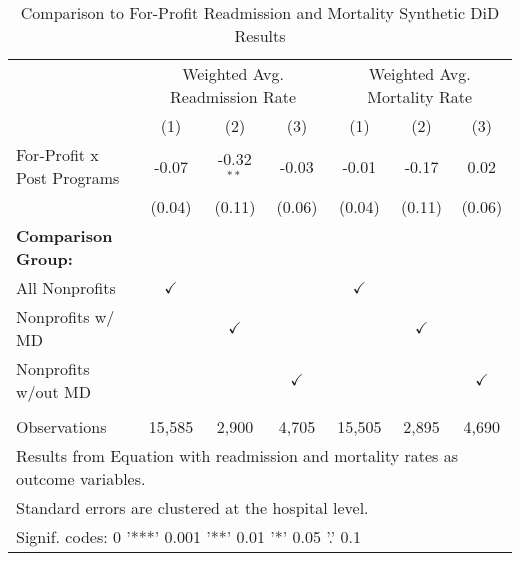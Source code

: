\begin{table}[ht!]

\caption{\label{tab:forprofit_readmort_synth}Comparison to For-Profit Readmission and Mortality Synthetic DiD Results}
\centering
\begin{tabular}[t]{lcccccc}
\toprule
\multicolumn{1}{c}{ } & \multicolumn{3}{c}{Weighted Avg. Readmission Rate} & \multicolumn{3}{c}{Weighted Avg. Mortality Rate} \\
 & (1) & (2) & (3) & (1) & (2) & (3)\\
\midrule
For-Profit x Post Programs & -0.07 & -0.32$^{**}$ & -0.03 & -0.01 & -0.17 & 0.02\\
 & (0.04) & (0.11) & (0.06) & (0.04) & (0.11) & (0.06)\\
\textbf{Comparison Group:} &  &  &  &  &  & \\
All Nonprofits & $\checkmark$ &  &  & $\checkmark$ &  & \\
Nonprofits w/ MD &  & $\checkmark$ &  &  & $\checkmark$ & \\
Nonprofits w/out MD &  &  & $\checkmark$ &  &  & $\checkmark$\\
 &  &  &  &  &  & \\
Observations & 15,585 & 2,900 & 4,705 & 15,505 & 2,895 & 4,690\\
\bottomrule
\multicolumn{7}{l}{\textsuperscript{} Results from Equation with readmission and mortality rates as outcome variables.}\\
\multicolumn{7}{l}{\textsuperscript{} Standard errors are clustered at the hospital level.}\\
\multicolumn{7}{l}{\textsuperscript{} Signif. codes: 0 '***' 0.001 '**' 0.01 '*' 0.05 '.' 0.1}\\
\end{tabular}
\end{table}
